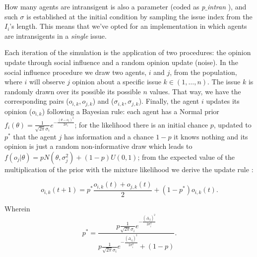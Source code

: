 \documentclass{article}
\begin{document}
How many agents are intransigent is also a parameter (coded as
\textit{p$\_$intran} ), and such \(\sigma\) is established at the initial
condition by sampling the issue index from the \(I_i\)'s length. This means that
we've opted for an implementation in which agents are intransigents in a
\textit{single} issue.

Each iteration of the simulation is the application of two procedures: the
opinion update through social influence and a random opinion update (noise). In
the social influence procedure we draw two agents, \(i\) and \(j\), from the
population, where \(i\) will observe \(j\) opinion about a specific issue \(k
\in (1 , \ldots, n)\). The issue $k$ is randomly drawn over its possible its
possible $n$ values. That way, we have the corresponding pairs (\(o_{i,k},
o_{j,k}\)) and (\(\sigma_{i,k}, \sigma_{j,k}\)). Finally, the agent \(i\)
updates its opinion (\(o_{i,k}\)) following a Bayesian rule: each agent has a
Normal prior \(f_i(\theta) = \frac{1}{\sqrt{2 \pi} \sigma_i} e^{- \frac{(\theta
    - o_i )^2}{2 \sigma_i}} \); for the likelihood there is an initial chance
\(p\), updated to \(p^*\) that the agent \(j\) has information and a chance
\(1-p\) it knows nothing and its opinion is just a random non-informative draw
which leads to \( f(o_j|\theta) = p N(\theta,\sigma_j^2) + (1-p)U(0,1) \); from
the expected value of the multiplication of the prior with the mixture
likelihood we derive the update rule \cite{martins12b}:

  \[
    o_{i,k}(t+1) =
    p^{*}
    \frac{o_{i,k}(t) + o_{j,k}(t) }{2}
    +
    (1 - p^{*})
    o_{i,k}(t).
  \]

  Wherein 
  \[
   p^{*}
    =
  \frac{
      p \frac{1}{\sqrt{2 \pi} \sigma_i}
      e^{- \frac{ (\Delta_{ij})^2}{2 \sigma_i^2}}
    }{
      p
      \frac{1}{\sqrt{2 \pi} \sigma_i}
    e^{- \frac{ ( \Delta_{ij})^2}{2 \sigma_i^2}}
    +
    (1 - p)
  }.
\]


\end{document}
